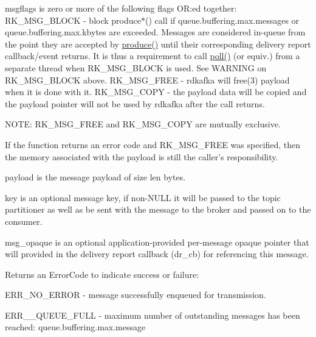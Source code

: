 {\ttfamily msgflags} is zero or more of the following flags OR:ed together: RK\_\-MSG\_\-BLOCK -\/ block {\ttfamily produce$\ast$}() call if {\ttfamily queue.buffering.max.messages} or {\ttfamily queue.buffering.max.kbytes} are exceeded. Messages are considered in-\/queue from the point they are accepted by \hyperlink{classRdKafka_1_1Producer_ab90a30c5e5fb006a3b4004dc4c9a7923}{produce()} until their corresponding delivery report callback/event returns. It is thus a requirement to call \hyperlink{classRdKafka_1_1Handle_a98d3b4ee48457ff13e4d5155e3fc5ea4}{poll()} (or equiv.) from a separate thread when RK\_\-MSG\_\-BLOCK is used. See WARNING on {\ttfamily RK\_\-MSG\_\-BLOCK} above. RK\_\-MSG\_\-FREE -\/ rdkafka will free(3) {\ttfamily payload} when it is done with it. RK\_\-MSG\_\-COPY -\/ the {\ttfamily payload} data will be copied and the {\ttfamily payload} pointer will not be used by rdkafka after the call returns.

NOTE: RK\_\-MSG\_\-FREE and RK\_\-MSG\_\-COPY are mutually exclusive.

If the function returns an error code and RK\_\-MSG\_\-FREE was specified, then the memory associated with the payload is still the caller's responsibility.

{\ttfamily payload} is the message payload of size {\ttfamily len} bytes.

{\ttfamily key} is an optional message key, if non-\/NULL it will be passed to the topic partitioner as well as be sent with the message to the broker and passed on to the consumer.

{\ttfamily msg\_\-opaque} is an optional application-\/provided per-\/message opaque pointer that will provided in the delivery report callback ({\ttfamily dr\_\-cb}) for referencing this message.

\begin{DoxyReturn}{Returns}
an ErrorCode to indicate success or failure:
\begin{DoxyItemize}
\item ERR\_\-NO\_\-ERROR -\/ message successfully enqueued for transmission.
\end{DoxyItemize}
\end{DoxyReturn}

\begin{DoxyItemize}
\item ERR\_\-\_\-QUEUE\_\-FULL -\/ maximum number of outstanding messages has been reached: {\ttfamily queue.buffering.max.message} 
\end{DoxyItemize}



